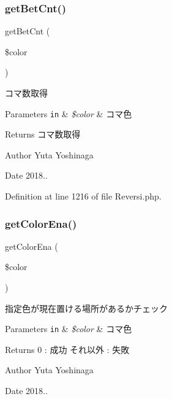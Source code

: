 \subsubsection{\texorpdfstring{get\+Bet\+Cnt()}{getBetCnt()}}
{\footnotesize\ttfamily get\+Bet\+Cnt (\begin{DoxyParamCaption}\item[{}]{\$color }\end{DoxyParamCaption})}



コマ数取得 


\begin{DoxyParams}[1]{Parameters}
\mbox{\tt in}  & {\em \$color} & コマ色 \\
\hline
\end{DoxyParams}
\begin{DoxyReturn}{Returns}
コマ数取得 
\end{DoxyReturn}
\begin{DoxyAuthor}{Author}
Yuta Yoshinaga 
\end{DoxyAuthor}
\begin{DoxyDate}{Date}
2018.. 
\end{DoxyDate}


Definition at line 1216 of file Reversi.\+php.

\mbox{\label{class_reversi_aead5ee041feb6ac2609266614ea06f78}} 
\subsubsection{\texorpdfstring{get\+Color\+Ena()}{getColorEna()}}
{\footnotesize\ttfamily get\+Color\+Ena (\begin{DoxyParamCaption}\item[{}]{\$color }\end{DoxyParamCaption})}



指定色が現在置ける場所があるかチェック 


\begin{DoxyParams}[1]{Parameters}
\mbox{\tt in}  & {\em \$color} & コマ色 \\
\hline
\end{DoxyParams}
\begin{DoxyReturn}{Returns}
0 \+: 成功 それ以外 \+: 失敗 
\end{DoxyReturn}
\begin{DoxyAuthor}{Author}
Yuta Yoshinaga 
\end{DoxyAuthor}
\begin{DoxyDate}{Date}
2018.. 
\end{DoxyDate}


